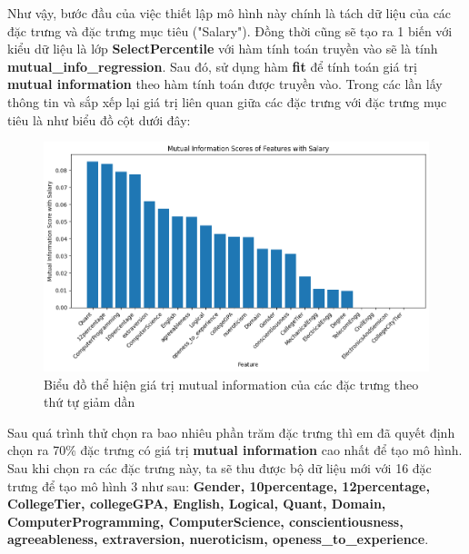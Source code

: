 \documentclass{report}
\begin{document}
    Như vậy, bước đầu của việc thiết lập mô hình này chính là tách dữ liệu của các đặc trưng và đặc trưng mục tiêu ("Salary"). Đồng thời cũng sẽ tạo ra 1 biến với kiểu dữ liệu là lớp \textbf{SelectPercentile} với hàm tính toán truyền vào sẽ là tính \textbf{mutual\_info\_regression}. Sau đó, sử dụng hàm \textbf{fit} để tính toán giá trị \textbf{mutual information} theo hàm tính toán được truyền vào. Trong các lần lấy thông tin và sắp xếp lại giá trị liên quan giữa các đặc trưng với đặc trưng mục tiêu là như biểu đồ cột dưới đây:
    \begin{figure}[H]
        \includegraphics[width=\textwidth, keepaspectratio]{assets/bar_chart.png}
        \centering
        \caption{Biểu đồ thể hiện giá trị mutual information của các đặc trưng theo thứ tự giảm dần}
    \end{figure}
    
    Sau quá trình thử  chọn ra bao nhiêu phần trăm đặc trưng thì em đã quyết định chọn ra 70\% đặc trưng có giá trị \textbf{mutual information} cao nhất để tạo mô hình. Sau khi chọn ra các đặc trưng này, ta sẽ thu được bộ dữ liệu mới với 16 đặc trưng để tạo mô hình 3 như sau: \textbf{Gender, 10percentage, 12percentage, CollegeTier, collegeGPA, English, Logical, Quant, Domain, ComputerProgramming, ComputerScience, conscientiousness, agreeableness, extraversion, nueroticism, openess\_to\_experience}.
\end{document}
